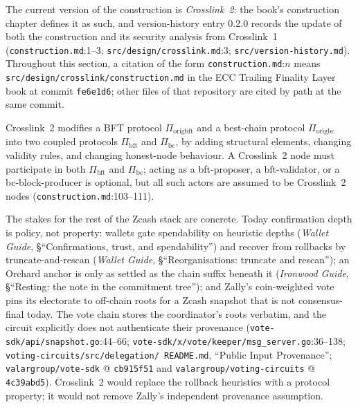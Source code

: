\documentclass[11pt,a4paper]{article}
\theoremstyle{definition}
\begin{document}
The current version of the construction is \emph{Crosslink~2}: the book's
construction chapter defines it as such, and version-history entry 0.2.0
records the update of both the construction and its security analysis from
Crosslink~1 (\texttt{construction.md}:1--3;
\texttt{src/design/crosslink.md}:3; \texttt{src/version-history.md}).
Throughout this section, a citation of the form \texttt{construction.md}:$n$
means \texttt{src/design/crosslink/construction.md} in the ECC Trailing
Finality Layer book at commit \texttt{fe6e1d6}; other files of that
repository are cited by path at the same commit.

Crosslink~2 modifies a BFT protocol $\Pi_{\mathrm{origbft}}$ and a
best-chain protocol $\Pi_{\mathrm{origbc}}$ into two coupled protocols
$\Pi_{\mathrm{bft}}$ and $\Pi_{\mathrm{bc}}$, by adding structural
elements, changing validity rules, and changing honest-node behaviour. A
Crosslink~2 node must participate in both $\Pi_{\mathrm{bft}}$ and
$\Pi_{\mathrm{bc}}$; acting as a bft-proposer, a bft-validator, or a
bc-block-producer is optional, but all such actors are assumed to be
Crosslink~2 nodes (\texttt{construction.md}:103--111).

The stakes for the rest of the Zcash stack are concrete. Today
confirmation depth is policy, not property: wallets gate spendability on
heuristic depths (\emph{Wallet Guide}, \S``Confirmations, trust, and
spendability'') and recover from rollbacks by truncate-and-rescan
(\emph{Wallet Guide}, \S``Reorganisations: truncate and rescan''); an
Orchard anchor is only as settled as the chain suffix beneath it
(\emph{Ironwood Guide}, \S``Resting: the note in the commitment tree''); and
Zally's coin-weighted vote pins its electorate to off-chain roots for a
Zcash snapshot that is not consensus-final today. The vote chain stores
the coordinator's roots verbatim, and the circuit explicitly does not
authenticate their provenance (\texttt{vote-sdk/api/snapshot.go}:44--66;
\texttt{vote-sdk/x/vote/keeper/msg\_server.go}:36--138;
\texttt{voting-circuits/\allowbreak src/\allowbreak delegation/\allowbreak
README.md}, ``Public Input Provenance'';
\texttt{valargroup/\allowbreak vote-sdk} @ \texttt{cb915f51} and
\texttt{valargroup/\allowbreak voting-circuits} @ \texttt{4c39abd5}).
Crosslink~2
would replace the rollback heuristics with a
protocol property; it would not remove Zally's independent provenance
assumption.
\end{document}
